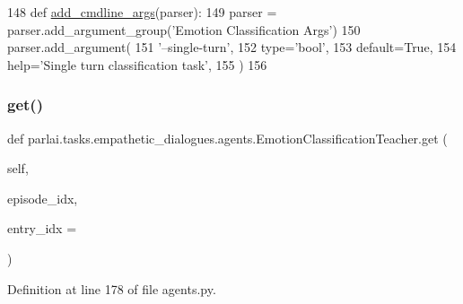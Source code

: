 \begin{DoxyCode}
148     \textcolor{keyword}{def }\hyperlink{namespaceparlai_1_1agents_1_1drqa_1_1config_a62fdd5554f1da6be0cba185271058320}{add\_cmdline\_args}(parser):
149         parser = parser.add\_argument\_group(\textcolor{stringliteral}{'Emotion Classification Args'})
150         parser.add\_argument(
151             \textcolor{stringliteral}{'--single-turn'},
152             type=\textcolor{stringliteral}{'bool'},
153             default=\textcolor{keyword}{True},
154             help=\textcolor{stringliteral}{'Single turn classification task'},
155         )
156 
\end{DoxyCode}
\mbox{\label{classparlai_1_1tasks_1_1empathetic__dialogues_1_1agents_1_1EmotionClassificationTeacher_a21b3ea704923617e13db32c102f59841}} 
\subsubsection{\texorpdfstring{get()}{get()}}
{\footnotesize\ttfamily def parlai.\+tasks.\+empathetic\+\_\+dialogues.\+agents.\+Emotion\+Classification\+Teacher.\+get (\begin{DoxyParamCaption}\item[{}]{self,  }\item[{}]{episode\+\_\+idx,  }\item[{}]{entry\+\_\+idx = {} }\end{DoxyParamCaption})}



Definition at line 178 of file agents.\+py.


